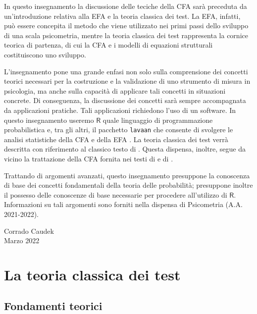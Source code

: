 \documentclass[
  11pt,
]{krantz}
\theoremstyle{definition}
\theoremstyle{definition}
\theoremstyle{definition}
\theoremstyle{definition}
\theoremstyle{remark}
\begin{document}
In questo insegnamento la discussione delle teciche della CFA sarà preceduta da un'introduzione relativa alla EFA e la teoria classica dei test. La EFA, infatti, può essere concepita il metodo che viene utilizzato nei primi passi dello sviluppo di una scala psicometria, mentre la teoria classica dei test rappresenta la cornice teorica di partenza, di cui la CFA e i modelli di equazioni strutturali costituiscono uno sviluppo.

L'insegnamento pone una grande enfasi non solo sulla comprensione dei concetti teorici necessari per la costruzione e la validazione di uno strumento di misura in psicologia, ma anche sulla capacità di applicare tali concetti in situazioni concrete. Di conseguenza, la discussione dei concetti sarà sempre accompagnata da applicazioni pratiche. Tali applicazioni richiedono l'uso di un software. In questo insegnamento useremo \(\textsf{R}\) \citep{rmanual} quale linguaggio di programmazione probabilistica e, tra gli altri, il pacchetto \texttt{lavaan} che consente di svolgere le analisi statistiche della CFA e della EFA \citep{beaujean2014latent}. La teoria classica dei test verrà descritta con riferimento al classico testo di \citet{lord1968statistical}. Questa dispensa, inoltre, segue da vicino la trattazione della CFA fornita nei testi di \citet{mcdonald2013test} e di \citet{brown2015confirmatory}.

Trattando di argomenti avanzati, questo insegnamento presuppone la conoscenza di base dei concetti fondamentali della teoria delle probabilità; presuppone inoltre il possesso delle conoscenze di base necessarie per procedere all'utilizzo di \(\textsf{R}\). Informazioni su tali argomenti sono forniti nella dispensa di Psicometria (A.A. 2021-2022).

\begin{flushright}
Corrado Caudek\\
Marzo 2022 \end{flushright}

\mainmatter

\hypertarget{part-la-teoria-classica-dei-test}{%
\part{La teoria classica dei test}\label{part-la-teoria-classica-dei-test}}

\hypertarget{ch:teoria_classica}{%
\chapter{Fondamenti teorici}\label{ch:teoria_classica}}
\end{document}
